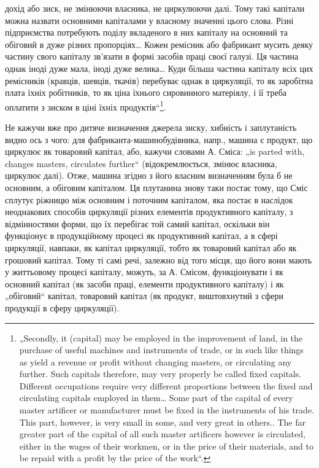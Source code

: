 \parcont{}  %
дохід або зиск, не змінюючи власника, не циркулюючи далі. Тому такі
капітали можна назвати основними капіталами у власному значенні цього
слова. Різні підприємства потребують поділу вкладеного в них капіталу
на основний та обіговий в дуже різних пропорціях\dots{} Кожен ремісник
або фабрикант мусить деяку частину свого капіталу зв’язати в формі
засобів праці своєї галузі. Ця частина однак іноді дуже мала, іноді дуже
велика\dots{} Куди більша частина капіталу всіх цих ремісників (кравців, шевців,
ткачів) перебуває однак в циркуляції, то як заробітна плата їхніх
робітників, то як ціна їхнього сировинного матеріялу, і її треба оплатити
з зиском в ціні їхніх продуктів“\footnote*{
„Secondly, it (capital) may be employed in the improvement of land, in the
purchase of useful machines and instruments of trade, or in such like things as
yield a revenue or profit without changing masters, or circulating any further. Such
capitals therefore, may very properly be called fixed capitals. Different occupations
require very different proportions between the fixed and circulating capitals employed
in them\dots{} Some part of the capital of every master artificer or manufacturer
must be fixed in the instruments of his trade. This part, however, is very small in
some, and very great in others.. The far greater part of the capital of all such master
artificers however is circulated, either in the wages of their workmen, or in the
price of their materials, and to be repaid with a profit by the price of the work“.
}.

Не кажучи вже про дитяче визначення джерела зиску, хибність і заплутаність
видно ось з чого: для фабриканта-машинобудівника, напр.,
машина є продукт, що циркулює як товаровий капітал, або, кажучи словами
А. Сміса: „is parted with, changes masters, circulates further“ (відокремлюється,
змінює власника, циркулює далі). Отже, машина згідно з
його власним визначенням була б не основним, а обіговим капіталом. Ця
плутанина знову таки постає тому, що Сміс сплутує ріжницю між основним
і поточним капіталом, яка постає в наслідок неоднакових способів
циркуляції різних елементів продуктивного капіталу, з відмінностями
форми, що їх перебігає той самий капітал, оскільки він функціонує
в продукційному процесі як продуктивний капітал, а в сфері
циркуляції, навпаки, як капітал циркуляції, тобто як товаровий капітал
або як грошовий капітал. Тому ті самі речі, залежно від того місця, що
його вони мають у життьовому процесі капіталу, можуть, за А. Смісом,
функціонувати і як основний капітал (як засоби праці, елементи продуктивного
капіталу) і як „обіговий“ капітал, товаровий капітал (як продукт,
виштовхнутий з сфери продукції в сферу циркуляції).

